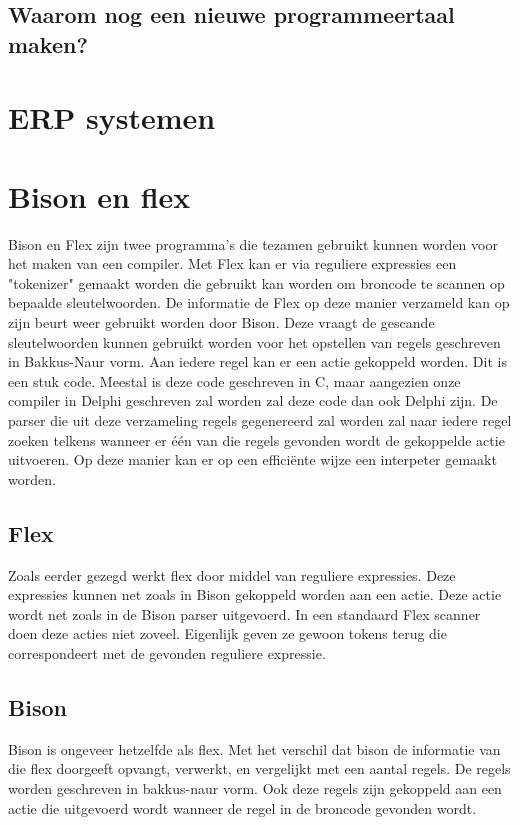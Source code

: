 \documentclass[12pt,a4paper]{article}
\begin{document}
\subsection{Waarom nog een nieuwe programmeertaal maken?}

\section{ERP systemen}


\section{Bison en flex}
Bison en Flex zijn twee programma's die tezamen gebruikt kunnen worden voor het maken van een compiler. Met Flex kan er via reguliere expressies een "tokenizer" gemaakt worden die gebruikt kan worden om broncode te scannen op bepaalde sleutelwoorden. De informatie de Flex op deze manier verzameld kan op zijn beurt weer gebruikt worden door Bison. Deze vraagt de gescande sleutelwoorden kunnen gebruikt worden voor het opstellen van regels geschreven in Bakkus-Naur vorm. Aan iedere regel kan er een actie gekoppeld worden. Dit is een stuk code. Meestal is deze code geschreven in C, maar aangezien onze compiler in Delphi geschreven zal worden zal deze code dan ook Delphi zijn. De parser die uit deze verzameling regels gegenereerd zal worden zal naar iedere regel zoeken telkens wanneer er één van die regels gevonden wordt de gekoppelde actie uitvoeren. Op deze manier kan er op een efficiënte wijze een interpeter gemaakt worden.

\subsection{Flex}
Zoals eerder gezegd werkt flex door middel van reguliere expressies. Deze expressies kunnen net zoals in Bison gekoppeld worden aan een actie. Deze actie wordt net zoals in de Bison parser uitgevoerd. In een standaard Flex scanner doen deze acties niet zoveel. Eigenlijk geven ze gewoon tokens terug die correspondeert met de gevonden reguliere expressie. 

\subsection{Bison}
Bison is ongeveer hetzelfde als flex. Met het verschil dat bison de informatie van die flex doorgeeft opvangt, verwerkt, en vergelijkt met een aantal regels. De regels worden geschreven in bakkus-naur vorm. Ook deze regels zijn gekoppeld aan een actie die uitgevoerd wordt wanneer de regel in de broncode gevonden wordt.
\end{document}
